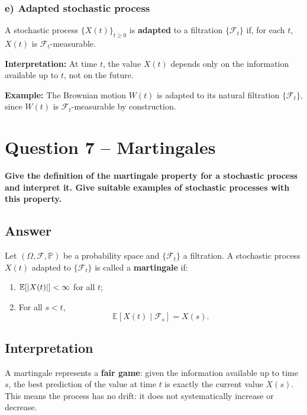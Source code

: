 \documentclass[12pt,a4paper]{book}
\theoremstyle{remark}
\newcommand{\PP}{\mathbb{P}}          %
\newcommand{\EE}{\mathbb{E}}          %
\newcommand{\F}{\mathcal{F}}          %
\newcommand{\Filtr}[1]{\{\mathcal{F}_{#1}\}} %
\DeclarePairedDelimiter{\abs}{\lvert}{\rvert} %
\begin{document}
\subsubsection*{e) Adapted stochastic process}
A stochastic process $\{X(t)\}_{t\ge0}$ is \textbf{adapted} to a filtration $\{\F_t\}$ if, for each $t$, $X(t)$ is $\F_t$-measurable.

\textbf{Interpretation:} At time $t$, the value $X(t)$ depends only on the information available up to $t$, not on the future.  

\textbf{Example:} The Brownian motion $W(t)$ is adapted to its natural filtration $\{\F_t\}$, since $W(t)$ is $\F_t$-measurable by construction.













\newpage
\section{Question 7 -- Martingales}
\textbf{Give the definition of the martingale property for a stochastic process and interpret it. Give suitable examples of stochastic processes with this property.}

\subsection*{Answer}
Let $(\Omega, \F, \PP)$ be a probability space and $\Filtr{t}$ a filtration. A stochastic process $X(t)$ adapted to $\Filtr{t}$ is called a \textbf{martingale} if:

\begin{enumerate}[label=\roman*)]
    \item $\EE[\abs{X(t)}] < \infty$ for all $t$;
    \item For all $s < t$, 
    \[
        \EE[X(t) \mid \F_s] = X(s).
    \]
\end{enumerate}

\subsection*{Interpretation}
A martingale represents a \textbf{fair game}: given the information available up to time $s$, the best prediction of the value at time $t$ is exactly the current value $X(s)$. This means the process has no drift: it does not systematically increase or decrease.
\end{document}
